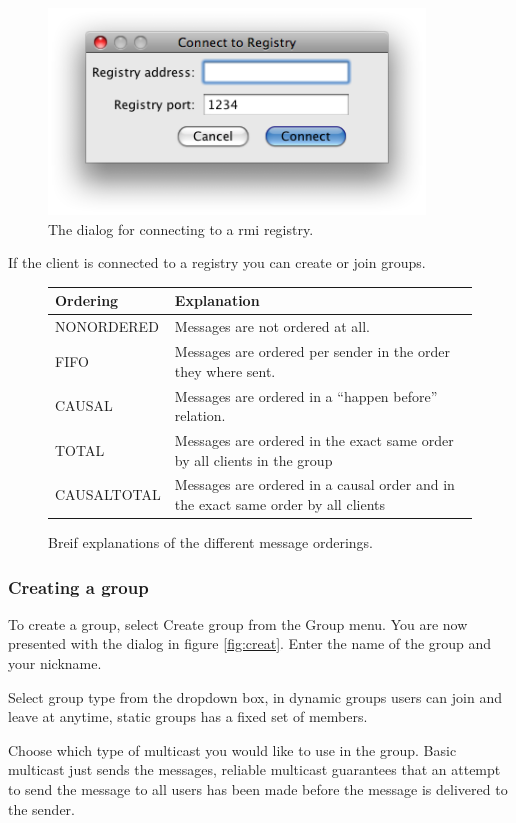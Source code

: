 \documentclass[a4paper,english]{article}
\begin{document}
\begin{figure}
\centering \includegraphics[width=10cm]{gui5.png}
\caption{The dialog for connecting to a rmi registry.}
\label{fig:contoreg}
\end{figure}

If the client is connected to a registry you can create or join groups.

\begin{figure}
\begin{tabular}{|l|p{9cm}|}
\hline
Ordering & Explanation \\
\hline
NONORDERED 	& Messages are not ordered at all. \\
FIFO		& Messages are ordered per sender in the order they where sent. \\
CAUSAL		& Messages are ordered in a ``happen before'' relation. \\
TOTAL		& Messages are ordered in the exact same order by all clients in the group \\
CAUSALTOTAL & Messages are ordered in a causal order and in the exact same order by all clients \\
\hline
\end{tabular}
\caption{Breif explanations of the different message orderings.}
\label{tab:ordering}
\end{figure}

\subsubsection{Creating a group}
To create a group, select Create group from the Group menu. You are now presented with the dialog in figure \vref{fig:creat}. Enter the name of the group and your nickname.

Select group type from the dropdown box, in dynamic groups users can join and leave at anytime, static groups has a fixed set of members.

Choose which type of multicast you would like to use in the group. Basic multicast just sends the messages, reliable multicast guarantees that an attempt to send the message to all users has been made before the message is delivered to the sender.
\end{document}
